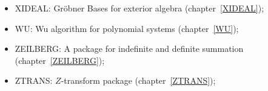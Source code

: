 \begin{itemize}
\item
{XIDEAL: Gr\"obner Bases for exterior algebra} (chapter~\ref{XIDEAL});

\item
{WU: Wu algorithm for polynomial systems} (chapter~\ref{WU});

\item
{ZEILBERG: A package for indefinite and definite summation}
(chapter~\ref{ZEILBERG}); 

\item
{ZTRANS: $Z$-transform package} (chapter~\ref{ZTRANS});

\end{itemize}

